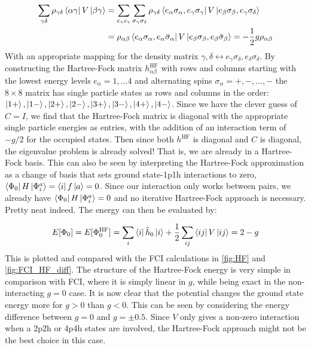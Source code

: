 \documentclass{article}
\newcommand{\inner}[3]{\bra{#1}#2\ket{#3}}
\newcommand{\hatreefock}[1]{#1^{\text{HF}}}
\begin{document}
    \begin{align*}
        \sum_{\gamma\delta} \rho_{\gamma\delta} \inner{\alpha\gamma}{V}{\beta\gamma} &= \sum_{e_\gamma e_\gamma} \sum_{\sigma_\gamma \sigma_\delta} \rho_{\gamma\delta} \inner{e_\alpha \sigma_\alpha, e_\gamma\sigma_\gamma}{V}{e_\beta \sigma_\beta, e_\gamma \sigma_\delta} \\
        &= \rho_{\alpha\beta} \inner{e_\alpha \sigma_\alpha, e_\alpha \bar{\sigma}_\alpha}{V}{e_\beta \sigma_\beta, e_\beta \bar{\sigma}_\beta} = -\frac{1}{2}g \rho_{\alpha\beta} 
    \end{align*}
    With an appropriate mapping for the density matrix $\gamma, \delta \leftrightarrow e_\gamma \sigma_\delta, e_\delta \sigma_\delta$. By constructing the Hartree-Fock matrix $\hatreefock{h}_{\alpha\beta}$ with rows and columns starting with the lowest energy levels $e_\alpha = 1, \ldots 4$ and alternating spins $\sigma_\alpha = +, -, \ldots , -$ the $8 \times 8$ matrix has single particle states as rows and columns in the order: $\ket{1+}, \ket{1-}, \ket{2+}, \ket{2-}, \ket{3+}, \ket{3-}, \ket{4+}, \ket{4-}$. Since we have the clever guess of $C = I$, we find that the Hartree-Fock matrix is diagonal with the appropriate single particle energies as entries, with the addition of an interaction term of $-g/2$ for the occupied states. Then since both $\hatreefock{h}$ is diagonal and $C$ is diagonal, the eigenvalue problem is already solved! That is, we are already in a Hartree-Fock basis. This can also be seen by interpreting the Hartree-Fock approximation as a change of basis that sets ground state-1p1h interactions to zero, $\inner{\Phi_0}{H}{\Phi_i^a} = \inner{i}{f}{a} = 0$. Since our interaction only works between pairs, we already have $\inner{\Phi_0}{H}{\Phi_i^a} = 0$ and no iterative Hartree-Fock approach is necessary. Pretty neat indeed. The energy can then be evaluated by:
    
    \begin{align*}
        E[\Phi_0] = E[\hatreefock{\Phi}_0] = \sum_i \inner{i}{\hat{h}_0}{i} + \frac{1}{2}\sum_{ij}\inner{ij}{V}{ij} = 2 - g
    \end{align*}
    This is plotted and compared with the FCI calculations in \cref{fig:HF} and \cref{fig:FCI_HF_diff}. The structure of the Hartree-Fock energy is very simple in comparison with FCI, where it is simply linear in $g$, while being exact in the non-interacting $g = 0$ case. It is now clear that the potential changes the ground state energy more for $g > 0$ than $g < 0$. This can be seen by considering the energy difference between $g = 0$ and $g = \pm 0.5$. Since $V$ only gives a non-zero interaction when a 2p2h or 4p4h states are involved, the Hartree-Fock approach might not be the best choice in this case. 
\end{document}
